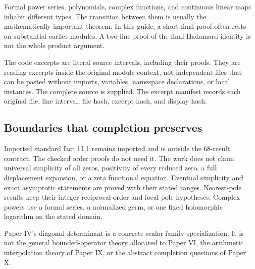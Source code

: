 Formal power series, polynomials, complex functions, and continuous linear maps inhabit different types. The transition between them is usually the mathematically important theorem. In this guide, a short final proof often rests on substantial earlier modules. A two-line proof of the final Hadamard identity is not the whole product argument.

The code excerpts are literal source intervals, including their proofs. They are reading excerpts inside the original module context, not independent files that can be pasted without imports, variables, namespace declarations, or local instances. The complete source is supplied. The excerpt manifest records each original file, line interval, file hash, excerpt hash, and display hash.

\subsection{Boundaries that completion preserves}
Imported standard fact 11.1 remains imported and is outside the 68-result contract. The checked order proofs do not need it. The work does not claim universal simplicity of all zeros, positivity of every reduced zero, a full displacement expansion, or a zeta functional equation. Eventual simplicity and exact asymptotic statements are proved with their stated ranges. Nearest-pole results keep their integer reciprocal-order and local pole hypotheses. Complex powers use a formal series, a normalized germ, or one fixed holomorphic logarithm on the stated domain.

Paper IV's diagonal determinant is a concrete scalar-family specialization. It is not the general bounded-operator theory allocated to Paper VI, the arithmetic interpolation theory of Paper IX, or the abstract completion questions of Paper X.

